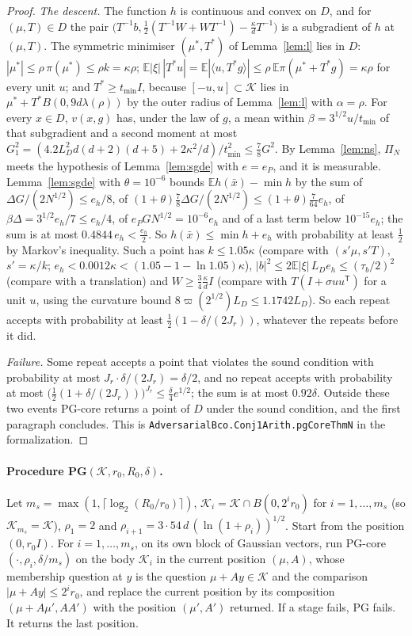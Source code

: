 \documentclass[11pt]{amsart}
\theoremstyle{definition}
\numberwithin{equation}{section}
\newcommand{\E}{\mathbb{E}}
\newcommand{\cK}{\mathcal{K}}
\newcommand{\ip}[1]{\langle #1\rangle}
\begin{document}
\begin{proof}
\emph{The descent.} The function $h$ is continuous and convex on $D$, and for $(\mu,T)\in D$ the pair $\bigl(T^{-1}b,\frac12(T^{-1}W+WT^{-1})-\frac\kappa dT^{-1}\bigr)$ is a subgradient of $h$ at $(\mu,T)$. The symmetric minimiser $(\mu^*,T^*)$ of Lemma~\ref{lem:l} lies in $D$: $|\mu^*|\le\rho\,\pi(\mu^*)\le\rho k=\kappa\rho$; $\E|\xi|\,|T^*u|=\E|\ip{u,T^*g}|\le\rho\,\E\pi(\mu^*+T^*g)=\kappa\rho$ for every unit $u$; and $T^*\ge t_{\min}I$, because $[-u,u]\subset\cK$ lies in $\mu^*+T^*B(0,9d\lambda(\rho))$ by the outer radius of Lemma~\ref{lem:l} with $\alpha=\rho$. For every $x\in D$, $v(x,g)$ has, under the law of $g$, a mean within $\beta=3^{1/2}u/t_{\min}$ of that subgradient and a second moment at most $G_1^2=(4.2L_D^2d(d+2)(d+5)+2\kappa^2/d)/t_{\min}^2\le\frac78G^2$. By Lemma~\ref{lem:ns}, $\Pi_N$ meets the hypothesis of Lemma~\ref{lem:sgde} with $e=e_P$, and it is measurable. Lemma~\ref{lem:sgde} with $\theta=10^{-6}$ bounds $\E h(\bar x)-\min h$ by the sum of $\Delta G/(2N^{1/2})\le e_h/8$, of $(1+\theta)\frac78\Delta G/(2N^{1/2})\le(1+\theta)\frac7{64}e_h$, of $\beta\Delta=3^{1/2}e_h/7\le e_h/4$, of $e_PGN^{1/2}=10^{-6}e_h$ and of a last term below $10^{-15}e_h$; the sum is at most $0.4844\,e_h<\frac{e_h}2$. So $h(\bar x)\le\min h+e_h$ with probability at least $\frac12$ by Markov's inequality. Such a point has $k\le1.05\kappa$ (compare with $(s'\mu,s'T)$, $s'=\kappa/k$; $e_h<0.0012\kappa<(1.05-1-\ln1.05)\kappa$), $|b|^2\le2\E|\xi|\,L_De_h\le(\tau_b/2)^2$ (compare with a translation) and $W\ge\frac34\frac\kappa dI$ (compare with $T(I+\sigma uu^{\mathsf T})$ for a unit $u$, using the curvature bound $8\varpi(2^{1/2})L_D\le1.1742L_D$). So each repeat accepts with probability at least $\frac12(1-\delta/(2J_r))$, whatever the repeats before it did.

\emph{Failure.} Some repeat accepts a point that violates the sound condition with probability at most $J_r\cdot\delta/(2J_r)=\delta/2$, and no repeat accepts with probability at most $\bigl(\frac12(1+\delta/(2J_r))\bigr)^{J_r}\le\frac\delta4e^{1/2}$; the sum is at most $0.92\delta$. Outside these two events PG-core returns a point of $D$ under the sound condition, and the first paragraph concludes.
This is \texttt{AdversarialBco.Conj1Arith.pgCoreThmN} in the formalization.
\end{proof}

\paragraph{Procedure PG$(\cK,r_0,R_0,\delta)$.} Let $m_s=\max(1,\lceil\log_2(R_0/r_0)\rceil)$, $\cK_i=\cK\cap B(0,2^ir_0)$ for $i=1,\dots,m_s$ (so $\cK_{m_s}=\cK$), $\rho_1=2$ and $\rho_{i+1}=3\cdot54\,d\,(\ln(1+\rho_i))^{1/2}$. Start from the position $(0,r_0I)$. For $i=1,\dots,m_s$, on its own block of Gaussian vectors, run PG-core$(\cdot,\rho_i,\delta/m_s)$ on the body $\cK_i$ in the current position $(\mu,A)$, whose membership question at $y$ is the question $\mu+Ay\in\cK$ and the comparison $|\mu+Ay|\le2^ir_0$, and replace the current position by its composition $(\mu+A\mu',AA')$ with the position $(\mu',A')$ returned. If a stage fails, PG fails. It returns the last position.
\end{document}
